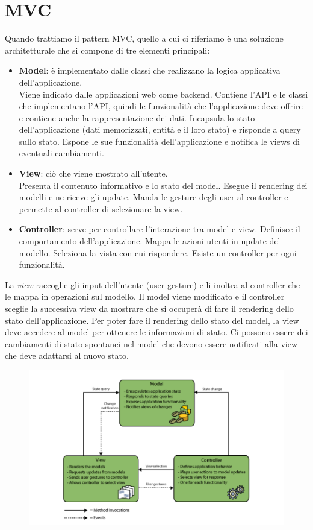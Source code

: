\section{MVC}
Quando trattiamo il pattern MVC, quello a cui ci riferiamo è una soluzione architetturale che si compone di tre elementi principali:
\begin{itemize}
    \item \textbf{Model}: è implementato dalle classi che realizzano la logica applicativa dell’applicazione.  \\
      Viene indicato dalle applicazioni web come backend. Contiene l’API e le classi che implementano l’API, quindi le funzionalità che l’applicazione deve offrire e contiene anche la rappresentazione dei dati.
      Incapsula lo stato dell’applicazione (dati memorizzati, entità e il loro stato) e risponde a query sullo stato.
      Espone le sue funzionalità dell’applicazione e notifica le views di eventuali cambiamenti.
    \item \textbf{View}: ciò che viene mostrato all’utente.\\ 
      Presenta il contenuto informativo e lo stato del model. Esegue il rendering dei modelli e ne riceve gli update. Manda le gesture degli user al controller e permette al controller di selezionare la view.
    \item \textbf{Controller}: serve per controllare l’interazione tra model e view.
      Definisce il comportamento dell’applicazione.
      Mappa le azioni utenti in update del modello.
      Seleziona la vista con cui rispondere.
      Esiste un controller per ogni funzionalità.
\end{itemize}
La \textit{view} raccoglie gli input dell’utente (user gesture) e li inoltra al controller che le mappa in operazioni sul modello.
Il model viene modificato e il controller sceglie la successiva view da mostrare che si occuperà di fare il rendering dello stato dell’applicazione.
Per poter fare il rendering dello stato del model, la view deve accedere al model per ottenere le informazioni di stato.
Ci possono essere dei cambiamenti di stato spontanei nel model che devono essere notificati alla view che deve adattarsi al nuovo stato.
\begin{figure}[H]
    \centering
    \includegraphics[scale=0.6]{Imm/mvc-archi.PNG}
\end{figure}

